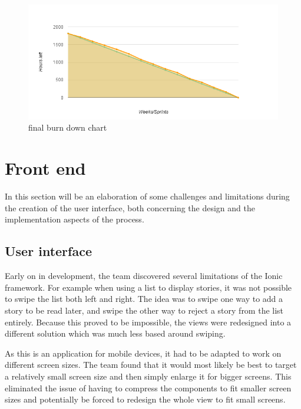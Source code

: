 \begin{figure}[h!]
	\centering
	\includegraphics[width=\textwidth]{fig/burnDownAfter}
	\caption{final burn down chart}
	\label{Fig:burnDownAfter}
\end{figure}

\section{Front end}

In this section will be an elaboration of some challenges and limitations during the creation of the user interface, both concerning the design and the implementation aspects of the process.

\subsection{User interface}

Early on in development, the team discovered several limitations of the Ionic framework. For example when using a list to display stories, it was not possible to swipe the list both left and right. The idea was to swipe one way to add a story to be read later, and swipe the other way to reject a story from the list entirely.  Because this proved to be impossible, the views were redesigned into a different solution which was much less based around swiping.\newline

As this is an application for mobile devices, it had to be adapted to work on different screen sizes. The team found that it would most likely be best to target a relatively small screen size and then simply enlarge it for bigger screens. This eliminated the issue of having to compress the components to fit smaller screen sizes and potentially be forced to redesign the whole view to fit small screens.\newline

